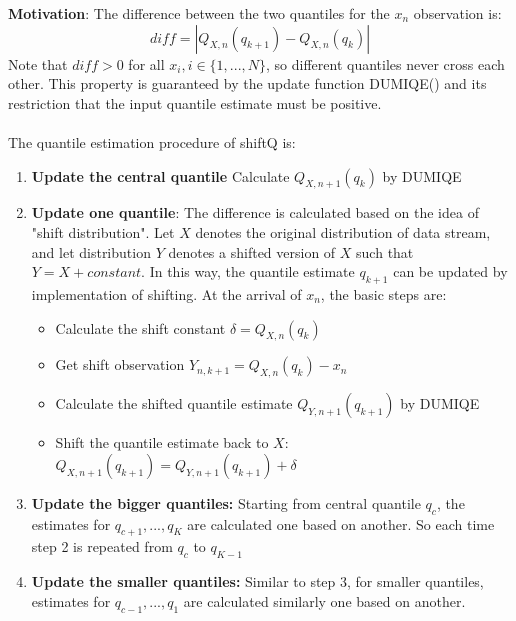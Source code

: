 \textbf{Motivation}: The difference between the two quantiles for the $x_{n}$ observation is:
$$
diff = |Q_{X,n}(q_{k+1}) - Q_{X,n}(q_k)|
$$
Note that $diff > 0$ for all $x_i, i \in \{1,...,N\}$, so different quantiles never cross each other. This property is guaranteed by the update function DUMIQE() and its restriction that the input quantile estimate must be positive.
\\\\
The quantile estimation procedure of shiftQ is:
\begin{enumerate}
    \item \textbf{Update the central quantile} Calculate $Q_{X,n+1}(q_k)$ by DUMIQE
    \item  \textbf{Update one quantile}: The difference is calculated based on the idea of "shift distribution". Let $X$ denotes the original distribution of data stream, and let distribution $Y$ denotes a shifted version of $X$ such that $Y = X + constant$. In this way, the quantile estimate $q_{k+1}$ can be updated by implementation of shifting. At the arrival of $x_n$, the basic steps are:
        \begin{itemize}
            \item Calculate the shift constant $\delta = Q_{X,n}(q_k)$
            \item Get shift observation $Y_{n,k+1} =  Q_{X,n}(q_k) - x_n$
            \item Calculate the shifted quantile estimate $Q_{Y, n+1}(q_{k+1})$ by DUMIQE
            \item Shift the quantile estimate back to $X$: $Q_{X,n+1}(q_{k+1}) = Q_{Y, n+1}(q_{k+1}) + \delta$
        \end{itemize}
    \item \textbf{Update the bigger quantiles:} Starting from central quantile $q_c$, the estimates for $q_{c+1}, ..., q_{K}$ are calculated one based on another. So each time step 2 is repeated from $q_c$ to $q_{K-1}$
    \item  \textbf{Update the smaller quantiles:} Similar to step 3, for smaller quantiles, estimates for $q_{c-1}, ..., q_{1}$ are calculated similarly one based on another.
\end{enumerate}

